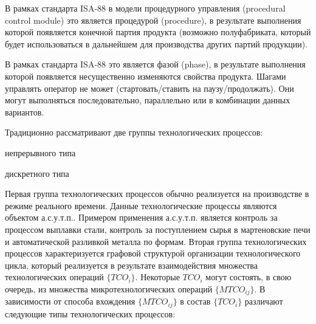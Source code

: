 В рамках стандарта ISA-88 в модели процедурного управления (procedural control module) это является процедурой (procedure), в результате выполнения которой появляется конечной партия продукта (возможно полуфабриката, который будет использоваться в дальнейшем для производства других партий продукции). 

\begin{SCn}
\end{SCn}

\begin{SCn}
\end{SCn}

В рамках стандарта ISA-88 это является фазой (phase), в результате выполнения которой появляется несущественно изменяются свойства продукта. Шагами управлять оператор не может (стартовать/ставить на паузу/продолжать). Они могут выполняться последовательно, параллельно или в комбинации данных вариантов.


\begin{SCn}
\end{SCn}



Традиционно рассматривают две группы технологических процессов:
\begin{textitemize}
	\item непрерывного типа
	\item дискретного типа
\end{textitemize}

Первая группа технологических процессов обычно реализуется на производстве в режиме реального времени. Данные технологические процессы являются объектом а.с.у.т.п.. Примером применения а.с.у.т.п. является контроль за процессом выплавки стали, контроль за поступлением сырья в мартеновские печи и автоматической разливкой металла по формам. Вторая группа технологических процессов характеризуется графовой структурой организации технологического цикла, который реализуется в результате взаимодействия множества технологических операций $\big\{TCO_i\big\}$. Некоторые $TCO_i$ могут состоять, в свою очередь, из множества микротехнологических операций $\big\{MTCO_{ij}\big\}$.
В зависимости от способа вхождения $\big\{MTCO_{ij}\big\}$  в состав $\big\{TCO_i\big\}$ различают следующие типы технологических процессов:

